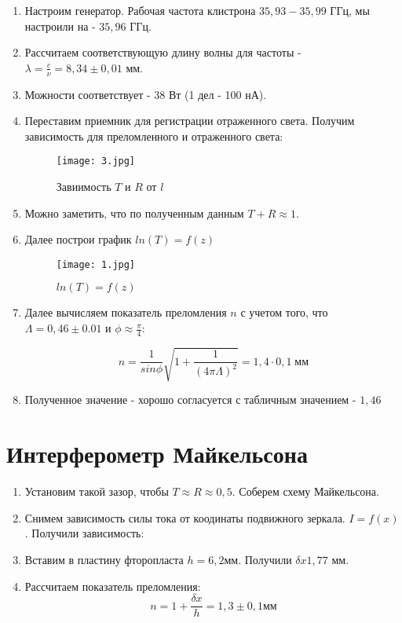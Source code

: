 \documentclass[a4paper]{article}
\begin{document}
\begin{enumerate}
    \item Настроим генератор. Рабочая частота клистрона $35,93 - 35,99$ ГГц, мы настроили на - $35,96$ ГГц.
    \item Рассчитаем соответствующую длину волны для частоты - $\lambda = \frac{c}{\nu} = 8,34 \pm 0,01$ мм. 
    \item Можности соответствует - $38$ Вт (1 дел - 100 нА).
    \item Переставим приемник для регистрации отраженного света.  Получим зависимость для преломленного и отраженного света:
    
    \begin{figure}[H]
		\begin{center}
		\label{graf_a}
		\texttt{[image: 3.jpg]}
		\caption{Завиимость $T$ и $R$ от $l$}
		\end{center}
	\end{figure}

    \item Можно заметить, что по полученным данным $T + R \approx 1$.
    \item Далее построи график $ln(T) = f(z)$
    
    \begin{figure}[H]
		\begin{center}
		\label{graf_a}
		\texttt{[image: 1.jpg]}
		\caption{$ln(T) = f(z)$}
		\end{center}
	\end{figure}

    \item Далее вычисляем показатель преломления $n$ с учетом того, что $\Lambda = 0,46 \pm 0.01$ и $\phi \approx \frac{\pi}{4}$:
    
    \begin{equation}
        n = \frac{1}{sin\phi}\sqrt{1+ \frac{1}{(4\pi\Lambda)^2}} = 1,4 \cdot 0,1 \; мм
    \end{equation}

    \item Полученное значение - хорошо согласуется с табличным значением - $1,46$
\end{enumerate}

\section{Интерферометр Майкельсона}

\begin{enumerate}
    \item Установим такой зазор, чтобы $T \approx R \approx 0,5 $. Соберем схему Майкельсона.
    \item Снимем зависимость силы тока от коодинаты подвижного зеркала. $ I = f(x)$. Получили зависимость:
    \item Вставим в пластину фторопласта $h = 6,2 $мм. Получили $\delta x 1,77$ мм.
    \item Рассчитаем показатель преломления:
    \begin{equation}
        n = 1 + \frac{\delta x}{h} = 1,3 \pm 0,1 мм
    \end{equation}

\end{enumerate}
\end{document}
